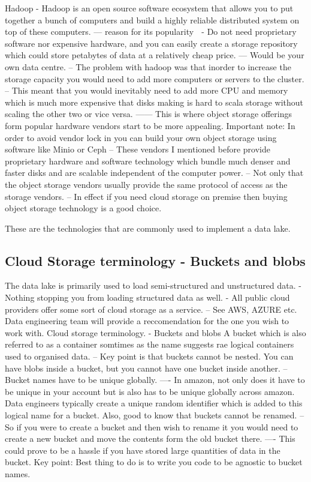 \documentclass[a4paper, 11pt]{article}
\begin{document}
    Hadoop
    - Hadoop is an open source software ecosystem that allows you to put together a bunch of computers and build a highly reliable distributed system on top of these computers.
    --- reason for its popularity ^^^
    - Do not need proprietary software nor expensive hardware, and you can easily create a storage repository which could store petabytes of data at a relatively cheap price.
    --- Would be your own data centre.
    -- The problem with hadoop was that inorder to increase the storage capacity you would need to add more computers or servers to the cluster.
    -- This meant that you would inevitably need to add more CPU and memory which is much more expensive that disks making is hard to scala storage without scaling the other two or vice versa.
    ------ This is where object storage offerings form popular hardware vendors start to be more appealing.
    Important note: In order to avoid vendor lock in you can build your own object storage  using software like Minio or Ceph
    -- These vendors I mentioned before provide proprietary hardware and software technology which bundle much denser and faster disks and are scalable independent of the computer power.
    -- Not only that the object storage vendors usually provide the same protocol of access as the storage vendors.
    -- In effect if you need cloud storage on premise then buying object storage technology is a good choice.

    These are the technologies that are commonly used to implement a data lake.
    
    \subsection{Cloud Storage terminology - Buckets and blobs}

    The data lake is primarily used to load semi-structured and unstructured data.
    - Nothing stopping you from loading structured data as well.
    - All public cloud providers offer some sort of cloud storage as a service.
    -- See AWS, AZURE etc. Data engineering team will provide a reccomendation for the one you wish to work with.
    Cloud storage terminology.
    - Buckets and blobs
    A bucket which is also referred to as a container somtimes as the name suggests rae logical containers used to organised data.
    -- Key point is that buckets cannot be nested.
    You can have blobs inside a bucket, but you cannot have one bucket inside another.
    -- Bucket names have to be unique globally.
    ---- In amazon, not only does it have to be unique in your account but is also has to be unique globally across amazon.
    Data engineers typically create a unique random identifier which is added to this logical name for a bucket.
    Also, good to know that buckets cannot be renamed.
    -- So if you were to create a bucket and then wish to rename it you would need to create a new bucket and move the contents form the old bucket there.
    ---- This could prove to be a hassle if you have stored large quantities of data in the bucket.
    Key point: Best thing to do is to write you code to be agnostic to bucket names.
\end{document}
